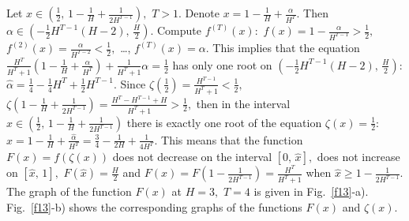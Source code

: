 \documentclass[12pt,a4paper]{amsart}
\begin{document}
Let $x \in \left( \frac12,\, 1-\frac{1}{H}+\frac{1}{2 H^{T-1}}  \right),$ $T>1.$ Denote $x = 1 - \frac{1}{H} + \frac{\alpha}{H^T}.$
Then $\alpha \in \left( -\frac12 H^{T-1} (H-2),\, \frac{H}{2} \right).$ Compute $f^{(T)}(x):$ $f(x) = 1 - \frac{\alpha}{H^{T-1}}>\frac12,$
$f^{(2)}(x) = \frac{\alpha}{H^{T-2}}<\frac12,$ \ldots , $f^{(T)}(x)=\alpha.$ This implies that the equation 
$\frac{H^T}{H^T+1} \left( 1-\frac{1}{H}+\frac{\alpha}{H^T} \right) + \frac{1}{H^T+1} \alpha = \frac12$ 
has only one root on $\left( -\frac12 H^{T-1} (H-2),\, \frac{H}{2} \right):$ $\widehat{\alpha} = \frac14 - \frac14 H^T + \frac12 H^{T-1}.$
Since $\zeta \left(\frac12\right) = \frac{H^{T-1}}{H^T+1} < \frac12,$ 
$\zeta \left( 1 - \frac{1}{H} + \frac{1}{2 H^{T-1}} \right) = \frac{H^T - H^{T-1} + H}{H^T +1} > \frac12,$ then in the interval 
$x \in \left( \frac12,\, 1-\frac{1}{H}+\frac{1}{2 H^{T-1}}  \right)$ there is exactly one root of the equation $\zeta (x) = \frac12:$ 
$\hat{x} = 1 - \frac{1}{H} + \frac{\widehat{\alpha}}{H^T} = \frac34 - \frac{1}{2H} + \frac{1}{4 H^T}.$ This means that the function 
$F(x)=f(\zeta(x))$ does not decrease on the interval $\left[0,\,\hat{x}\right],$ does not increase on $\left[\hat{x},\,1\right],$
$F(\hat{x})=\frac{H}{2}$ and $F(x) = F \left( 1 - \frac{1}{2 H^{T-1}} \right) = \frac{H^T}{H^T + 1}$ when 
$\hat{x} \geq 1 - \frac{1}{2 H^{T-1}}.$ The graph of the function $F(x)$ at $H=3,$ $T=4$ is given in Fig.~\ref{f13}-a). Fig.~\ref{f13}-b) 
shows the corresponding graphs of the functions $F(x)$ and $\zeta(x).$
\end{document}
